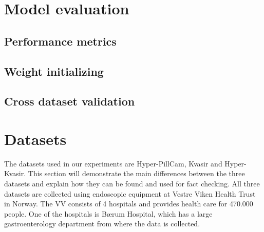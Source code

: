 \documentclass[thesis.tex]{subfiles}
\begin{document}
\section{Model evaluation}


\subsection{Performance metrics}


\subsection{Weight initializing}


\subsection{Cross dataset validation}






\section{Datasets} \label{sec:available_datasets}

The datasets used in our experiments are Hyper-PillCam, Kvasir and Hyper-Kvasir. This section will demonstrate the main differences between the three datasets and explain how they can be found and used for fact checking. All three datasets are collected using endoscopic equipment at Vestre Viken Health Trust in Norway. The VV consists of 4 hospitals and provides health care for 470.000 people. One of the hospitals is Bærum Hospital, which has a large gastroenterology department from where the data is collected.
\end{document}

